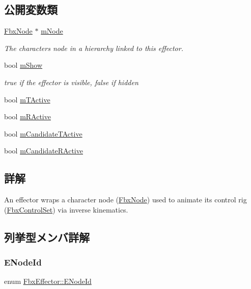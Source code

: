 \subsection*{公開変数類}
\begin{DoxyCompactItemize}
\item 
\hyperlink{class_fbx_node}{Fbx\+Node} $\ast$ \hyperlink{class_fbx_effector_ab039944d84107c7d17eef8b6915853f0}{m\+Node}
\begin{DoxyCompactList}\small\item\em The character\textquotesingle{}s node in a hierarchy linked to this effector. \end{DoxyCompactList}\item 
bool \hyperlink{class_fbx_effector_aea6c24780611a7878ed22d9358715e25}{m\+Show}
\begin{DoxyCompactList}\small\item\em {\ttfamily true} if the effector is visible, {\ttfamily false} if hidden \end{DoxyCompactList}\item 
bool \hyperlink{class_fbx_effector_ab4cb3feccf5586307ec12f9c208d256b}{m\+T\+Active}
\item 
bool \hyperlink{class_fbx_effector_a6a37a72600a06dba114a47d6c98731c7}{m\+R\+Active}
\item 
bool \hyperlink{class_fbx_effector_a624821039f6696c381004a85d2fdc237}{m\+Candidate\+T\+Active}
\item 
bool \hyperlink{class_fbx_effector_a12e10ffdcf48e38d2893623696ce188d}{m\+Candidate\+R\+Active}
\end{DoxyCompactItemize}


\subsection{詳解}
An effector wraps a character node (\hyperlink{class_fbx_node}{Fbx\+Node}) used to animate its control rig (\hyperlink{class_fbx_control_set}{Fbx\+Control\+Set}) via inverse kinematics. 

\subsection{列挙型メンバ詳解}
\mbox{\label{class_fbx_effector_a26afd81fd3d41431311004c16536e739}} 
\subsubsection{\texorpdfstring{E\+Node\+Id}{ENodeId}}
{\footnotesize\ttfamily enum \hyperlink{class_fbx_effector_a26afd81fd3d41431311004c16536e739}{Fbx\+Effector\+::\+E\+Node\+Id}}

